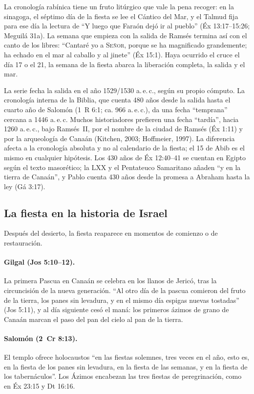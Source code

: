 \documentclass[11pt,letterpaper]{article}
\newcommand{\SENOR}{\textsc{Señor}}
\begin{document}
La cronología rabínica tiene un fruto litúrgico que vale la pena recoger: en la sinagoga, el séptimo día de la fiesta se lee el Cántico del Mar, y el Talmud fija para ese día la lectura de ``Y luego que Faraón dejó ir al pueblo'' (Éx 13:17--15:26; Meguilá 31a). La semana que empieza con la salida de Ramsés termina así con el canto de los libres: ``Cantaré yo a \SENOR, porque se ha magnificado grandemente; ha echado en el mar al caballo y al jinete'' (Éx 15:1). Haya ocurrido el cruce el día 17 o el 21, la semana de la fiesta abarca la liberación completa, la salida y el mar.

\begin{nota}
La serie fecha la salida en el año 1529/1530 a.\,e.\,c., según su propio cómputo. La cronología interna de la Biblia, que cuenta 480 años desde la salida hasta el cuarto año de Salomón (1~R 6:1; ca. 966 a.\,e.\,c.), da una fecha ``temprana'' cercana a 1446 a.\,e.\,c. Muchos historiadores prefieren una fecha ``tardía'', hacia 1260 a.\,e.\,c., bajo Ramsés~II, por el nombre de la ciudad de Ramsés (Éx 1:11) y por la arqueología de Canaán (Kitchen, 2003; Hoffmeier, 1997). La diferencia afecta a la cronología absoluta y no al calendario de la fiesta; el 15 de Abib es el mismo en cualquier hipótesis. Los 430 años de Éx 12:40--41 se cuentan en Egipto según el texto masorético; la LXX y el Pentateuco Samaritano añaden ``y en la tierra de Canaán'', y Pablo cuenta 430 años desde la promesa a Abraham hasta la ley (Gá 3:17).
\end{nota}

\subsection{La fiesta en la historia de Israel}
Después del desierto, la fiesta reaparece en momentos de comienzo o de restauración.

\paragraph{Gilgal (Jos 5:10--12).} La primera Pascua en Canaán se celebra en los llanos de Jericó, tras la circuncisión de la nueva generación. ``Al otro día de la pascua comieron del fruto de la tierra, los panes sin levadura, y en el mismo día espigas nuevas tostadas'' (Jos 5:11), y al día siguiente cesó el maná: los primeros ázimos de grano de Canaán marcan el paso del pan del cielo al pan de la tierra.

\paragraph{Salomón (2~Cr 8:13).} El templo ofrece holocaustos ``en las fiestas solemnes, tres veces en el año, esto es, en la fiesta de los panes sin levadura, en la fiesta de las semanas, y en la fiesta de los tabernáculos''. Los Ázimos encabezan las tres fiestas de peregrinación, como en Éx 23:15 y Dt 16:16.
\end{document}
